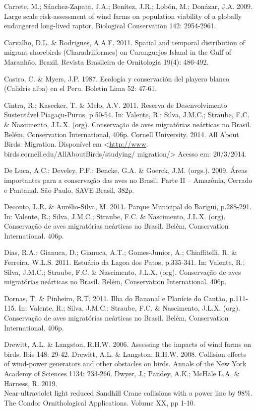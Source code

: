 \documentclass[
]{scrbook}
\begin{document}
Carrete, M.; Sánchez-Zapata, J.A.; Benítez, J.R.; Lobón, M.; Donázar, J.A. 2009. Large scale risk-assessment of wind farms on population viability of a globally endangered long-lived raptor. Biological Conservation 142: 2954-2961.

Carvalho, D.L. \& Rodrigues, A.A.F. 2011. Spatial and temporal distribution of migrant shorebirds (Charadriiformes) on Caranguejos Island in the Gulf of Maranhão, Brazil. Revista Brasileira de Ornitologia 19(4): 486-492.

Castro, C. \& Myers, J.P. 1987. Ecología y conservación del playero blanco (Calidris alba) en el Peru. Boletin Lima 52: 47-61.

Cintra, R.; Kasecker, T. \& Melo, A.V. 2011. Reserva de Desenvolvimento Sustentável Piagaçu-Purus, p.50-54. In: Valente, R.; Silva, J.M.C.; Straube, F.C. \& Nascimento, J.L.X. (org). Conservação de aves migratórias neárticas no Brasil. Belém, Conservation International, 406p.
Cornell University. 2014. All About Birds: Migration. Disponível em \textless{}\url{http://www}. birds.cornell.edu/AllAboutBirds/studying/ migration/\textgreater{} Acesso em: 20/3/2014.

De Luca, A.C.; Develey, P.F.; Bencke, G.A. \& Goerck, J.M. (orgs.). 2009. Áreas importantes para a conservação das aves no Brasil. Parte II -- Amazônia, Cerrado e Pantanal. São Paulo, SAVE Brasil, 382p.

Deconto, L.R. \& Aurélio-Silva, M. 2011. Parque Municipal do Barigüi, p.288-291. In: Valente, R.; Silva, J.M.C.; Straube, F.C. \& Nascimento, J.L.X. (org). Conservação de aves migratórias neárticas no Brasil. Belém, Conservation International. 406p.

Dias, R.A.; Gianuca, D.; Gianuca, A.T.; Gomes-Junior, A.; Chiaffitelli, R. \& Ferreira, W.L.S. 2011. Estuário da Lagoa dos Patos, p.335-341. In: Valente, R.; Silva, J.M.C.; Straube, F.C. \& Nascimento, J.L.X. (org). Conservação de aves migratórias neárticas no Brasil. Belém, Conservation International. 406p.

Dornas, T. \& Pinheiro, R.T. 2011. Ilha do Bananal e Planície do Cantão, p.111-115. In: Valente, R.; Silva, J.M.C.; Straube, F.C. \& Nascimento, J.L.X. (org). Conservação de aves migratórias neárticas no Brasil. Belém, Conservation International. 406p.

Drewitt, A.L. \& Langston, R.H.W. 2006. Assessing the impacts of wind farms on birds. Ibis 148: 29-42.
Drewitt, A.L. \& Langston, R.H.W. 2008. Collision effects of wind-power generators and other obstacles on birds. Annals of the New York Academy of Sciences 1134: 233-266.
Dwyer, J.; Pandey, A.K.; McHale L.A. \& Harness, R. 2019.\\
Near-ultraviolet light reduced Sandhill Crane collisions with a power line by 98\%. The Condor Ornithological Applications. Volume XX, pp 1-10.
\end{document}
